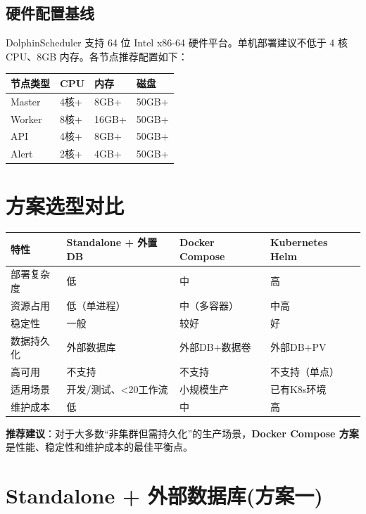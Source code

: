 \documentclass[UTF8, a4paper]{ctexbook}
\begin{document}
\section{硬件配置基线}
	
DolphinScheduler 支持 64 位 Intel x86-64 硬件平台。单机部署建议不低于 4 核 CPU、8GB 内存。各节点推荐配置如下：
	
\begin{longtable}{p{3cm}p{3cm}p{3cm}p{3cm}}
	\toprule
	\textbf{节点类型} & \textbf{CPU} & \textbf{内存} & \textbf{磁盘} \\
	\midrule
	Master & 4核+ & 8GB+ & 50GB+ \\
	Worker & 8核+ & 16GB+ & 50GB+ \\
	API   & 4核+ & 8GB+  & 50GB+ \\
	Alert & 2核+ & 4GB+  & 50GB+ \\
	\bottomrule
\end{longtable}
	
\chapter{方案选型对比}
	
\begin{longtable}{p{3.5cm}p{2.5cm}p{2.5cm}p{3.5cm}}
	\toprule
	\textbf{特性} & \textbf{Standalone + 外置DB} & \textbf{Docker Compose} & \textbf{Kubernetes Helm} \\
	\midrule
	部署复杂度 & 低   & 中   & 高   \\
	资源占用   & 低（单进程） & 中（多容器） & 中高 \\
	稳定性     & 一般 & 较好 & 好   \\
	数据持久化 & 外部数据库 & 外部DB+数据卷 & 外部DB+PV \\
	高可用     & 不支持 & 不支持 & 不支持（单点） \\
	适用场景   & 开发/测试、<20工作流 & 小规模生产 & 已有K8s环境 \\
	维护成本   & 低   & 中   & 高   \\
	\bottomrule
\end{longtable}
	
\textbf{推荐建议}：对于大多数“非集群但需持久化”的生产场景，\textbf{Docker Compose 方案} 是性能、稳定性和维护成本的最佳平衡点。
	
\chapter{Standalone + 外部数据库(方案一)}
	
\end{document}

